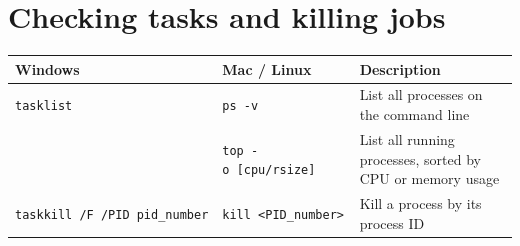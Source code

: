 \documentclass[]{book}
\begin{document}
\hypertarget{checking-tasks-and-killing-jobs}{%
\section{Checking tasks and killing jobs}\label{checking-tasks-and-killing-jobs}}

\begin{longtable}[]{@{}lll@{}}
\toprule
\begin{minipage}[b]{0.23\columnwidth}\raggedright
Windows\strut
\end{minipage} & \begin{minipage}[b]{0.34\columnwidth}\raggedright
Mac / Linux\strut
\end{minipage} & \begin{minipage}[b]{0.34\columnwidth}\raggedright
Description\strut
\end{minipage}\tabularnewline
\midrule
\endhead
\begin{minipage}[t]{0.23\columnwidth}\raggedright
\texttt{tasklist}\strut
\end{minipage} & \begin{minipage}[t]{0.34\columnwidth}\raggedright
\texttt{ps\ -v}\strut
\end{minipage} & \begin{minipage}[t]{0.34\columnwidth}\raggedright
List all processes on the command line\strut
\end{minipage}\tabularnewline
\begin{minipage}[t]{0.23\columnwidth}\raggedright
\strut
\end{minipage} & \begin{minipage}[t]{0.34\columnwidth}\raggedright
\texttt{top\ -o\ {[}cpu/rsize{]}}\strut
\end{minipage} & \begin{minipage}[t]{0.34\columnwidth}\raggedright
List all running processes, sorted by CPU or memory usage\strut
\end{minipage}\tabularnewline
\begin{minipage}[t]{0.23\columnwidth}\raggedright
\texttt{taskkill\ /F\ /PID\ pid\_number}\strut
\end{minipage} & \begin{minipage}[t]{0.34\columnwidth}\raggedright
\texttt{kill\ \textless{}PID\_number\textgreater{}}\strut
\end{minipage} & \begin{minipage}[t]{0.34\columnwidth}\raggedright
Kill a process by its process ID\strut
\end{minipage}\tabularnewline

\end{longtable}
\end{document}
